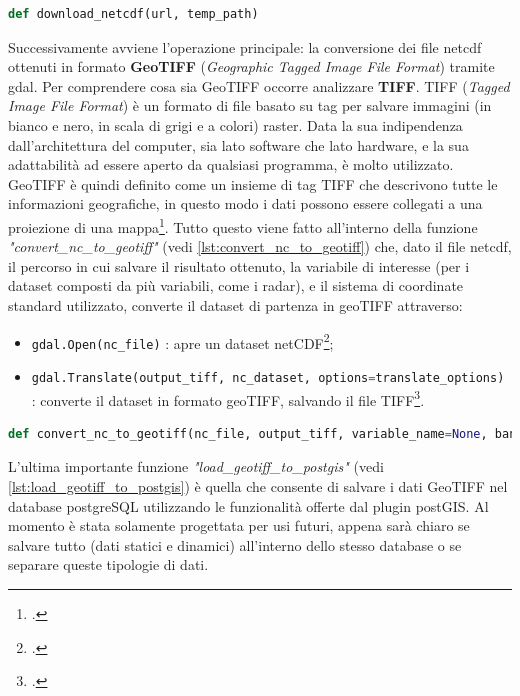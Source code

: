 \documentclass[./main.tex]{subfiles}
\begin{document}
\begin{lstlisting}[language=Python, 
    caption={Definzione funzione per scariare in local un file netCDF dato il link al server.},
    label=lst:etl_download_netcdf]
    def download_netcdf(url, temp_path)
\end{lstlisting}

Successivamente avviene l'operazione principale: la conversione dei file netcdf ottenuti in formato \textbf{GeoTIFF}  (\textit{Geographic Tagged Image File Format}) tramite gdal. Per comprendere cosa sia GeoTIFF occorre analizzare \textbf{TIFF}. TIFF (\textit{Tagged Image File Format}) è un formato di file basato su tag per salvare immagini (in bianco e nero, in scala di grigi e a colori) raster. Data la sua indipendenza dall'architettura del computer, sia lato software che lato hardware, e la sua adattabilità ad essere aperto da qualsiasi programma, è molto utilizzato. GeoTIFF è quindi definito come un insieme di tag TIFF che descrivono tutte le informazioni geografiche, in questo modo i dati possono essere collegati a una proiezione di una mappa\footcite[1-4]{tiff-geotiff}. Tutto questo viene fatto all'interno della funzione \textit{"convert\_nc\_to\_geotiff"} (vedi \autoref{lst:convert_nc_to_geotiff}) che, dato il file netcdf, il percorso in cui salvare il risultato ottenuto, la variabile di interesse (per i dataset composti da più variabili, come i radar), e il sistema di coordinate standard utilizzato, converte il dataset di partenza in geoTIFF attraverso:
\begin{itemize}
    \item \lstinline[language=Python]{gdal.Open(nc_file)}
    : apre un dataset netCDF\footcite[\url{https://gdal.org/tutorials/raster_api_tut.html\#opening-the-file}]{gdal-docs};
    \item \lstinline[language=Python]{gdal.Translate(output_tiff, nc_dataset, options=translate_options)}
    : converte il dataset in formato geoTIFF, salvando il file TIFF\footcite[\url{https://gdal.org/programs/gdal_translate.html\#gdal-translate}]{gdal-docs}.
\end{itemize}

\begin{lstlisting}[language=Python, 
    caption={Definzione funzione per la conversione dei file netCDF in geoTIFF.},
    label=lst:convert_nc_to_geotiff]
    def convert_nc_to_geotiff(nc_file, output_tiff, variable_name=None, band=1, crs="EPSG:4326")
\end{lstlisting}

L'ultima importante funzione \textit{"load\_geotiff\_to\_postgis"} (vedi \autoref{lst:load_geotiff_to_postgis}) è quella che consente di salvare i dati GeoTIFF nel database postgreSQL utilizzando le funzionalità offerte dal plugin postGIS. Al momento è stata solamente progettata per usi futuri, appena sarà chiaro se salvare tutto (dati statici e dinamici) all'interno dello stesso database o se separare queste tipologie di dati.\par
\end{document}
